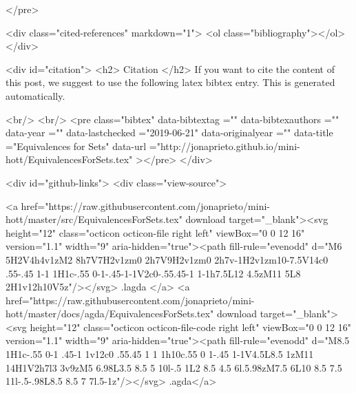 </pre>


  <div class="cited-references" markdown="1">
  <ol class="bibliography"></ol>
  </div>


  
  <div id="citation">
  <h2> Citation </h2>
  If you want to cite the content of this post,
  we suggest to use the following latex bibtex entry.
  This is generated automatically.

  <br/>
  <br/>
  <pre class="bibtex"
       data-bibtextag =""
       data-bibtexauthors =""
       data-year =""
       data-lastchecked ="2019-06-21"
       data-originalyear =""
       data-title ="Equivalences for Sets"
       data-url ="http://jonaprieto.github.io/mini-hott/EquivalencesForSets.tex"
  ></pre>
  </div>
  

  <div id="github-links">
    <div class="view-source">
      
        <a href="https://raw.githubusercontent.com/jonaprieto/mini-hott/master/src/EquivalencesForSets.tex" download target="_blank"><svg height="12" class="octicon octicon-file right left" viewBox="0 0 12 16" version="1.1" width="9" aria-hidden="true"><path fill-rule="evenodd" d="M6 5H2V4h4v1zM2 8h7V7H2v1zm0 2h7V9H2v1zm0 2h7v-1H2v1zm10-7.5V14c0 .55-.45 1-1 1H1c-.55 0-1-.45-1-1V2c0-.55.45-1 1-1h7.5L12 4.5zM11 5L8 2H1v12h10V5z"/></svg> .lagda </a>
        <a href="https://raw.githubusercontent.com/jonaprieto/mini-hott/master/docs/agda/EquivalencesForSets.tex" download target="_blank"><svg height="12" class="octicon octicon-file-code right left" viewBox="0 0 12 16" version="1.1" width="9" aria-hidden="true"><path fill-rule="evenodd" d="M8.5 1H1c-.55 0-1 .45-1 1v12c0 .55.45 1 1 1h10c.55 0 1-.45 1-1V4.5L8.5 1zM11 14H1V2h7l3 3v9zM5 6.98L3.5 8.5 5 10l-.5 1L2 8.5 4.5 6l.5.98zM7.5 6L10 8.5 7.5 11l-.5-.98L8.5 8.5 7 7l.5-1z"/></svg> .agda</a>
      
